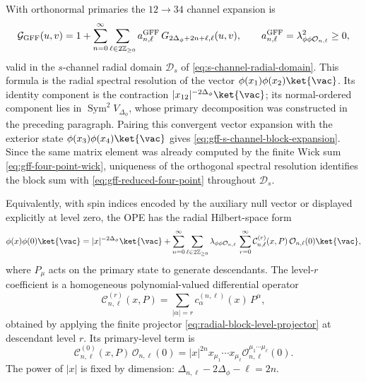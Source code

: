With orthonormal primaries the \(12\to34\) channel expansion is
\begin{equation}
  \mathcal G_{\rm GFF}(u,v)
  =
  1+
  \sum_{n=0}^{\infty}
  \sum_{\ell\in2\mathbb Z_{\ge0}}
  a^{\rm GFF}_{n,\ell}\,
  G_{2\Delta_\phi+2n+\ell,\ell}(u,v),
  \qquad
  a^{\rm GFF}_{n,\ell}
  =
  \lambda_{\phi\phi\mathcal O_{n,\ell}}^2\ge0 ,
  \label{eq:gff-s-channel-block-expansion}
\end{equation}
valid in the \(s\)-channel radial domain
\(\mathcal D_s\) of \eqref{eq:s-channel-radial-domain}.  This formula is the
radial spectral resolution of the vector
\(\phi(x_1)\phi(x_2)\ket{\vac}\).  Its identity component is the contraction
\(|x_{12}|^{-2\Delta_\phi}\ket{\vac}\); its normal-ordered component lies in
\(\operatorname{Sym}^2V_{\Delta_\phi}\), whose primary decomposition was
constructed in the preceding paragraph.  Pairing this convergent vector
expansion with the exterior state
\(\phi(x_3)\phi(x_4)\ket{\vac}\) gives
\eqref{eq:gff-s-channel-block-expansion}.  Since the same matrix element was
already computed by the finite Wick sum \eqref{eq:gff-four-point-wick},
uniqueness of the orthogonal spectral resolution identifies the block sum
with \eqref{eq:gff-reduced-four-point} throughout \(\mathcal D_s\).

Equivalently, with spin indices encoded by the auxiliary null vector or
displayed explicitly at level zero, the OPE has the radial Hilbert-space form
\begin{equation}
  \phi(x)\phi(0)\ket{\vac}
  =
  |x|^{-2\Delta_\phi}\ket{\vac}
  +
  \sum_{n=0}^{\infty}
  \sum_{\ell\in2\mathbb Z_{\ge0}}
  \lambda_{\phi\phi\mathcal O_{n,\ell}}\,
  \sum_{r=0}^{\infty}
  \mathcal C^{(r)}_{n,\ell}(x,P)\,
  \mathcal O_{n,\ell}(0)\ket{\vac},
  \label{eq:gff-primary-ope-vector}
\end{equation}
where \(P_\mu\) acts on the primary state to generate descendants.  The
level-\(r\) coefficient is a homogeneous polynomial-valued differential
operator
\[
  \mathcal C^{(r)}_{n,\ell}(x,P)
  =
  \sum_{|\alpha|=r}
  c^{(n,\ell)}_{\alpha}(x)\,P^\alpha,
\]
obtained by applying the finite projector
\eqref{eq:radial-block-level-projector} at descendant level \(r\).  Its
primary-level term is
\[
  \mathcal C^{(0)}_{n,\ell}(x,P)\,
  \mathcal O_{n,\ell}(0)
  =
  |x|^{2n}
  x_{\mu_1}\cdots x_{\mu_\ell}
  \mathcal O_{n,\ell}^{\mu_1\cdots\mu_\ell}(0).
\]
The power of \(|x|\) is fixed by dimension:
\(\Delta_{n,\ell}-2\Delta_\phi-\ell=2n\).

